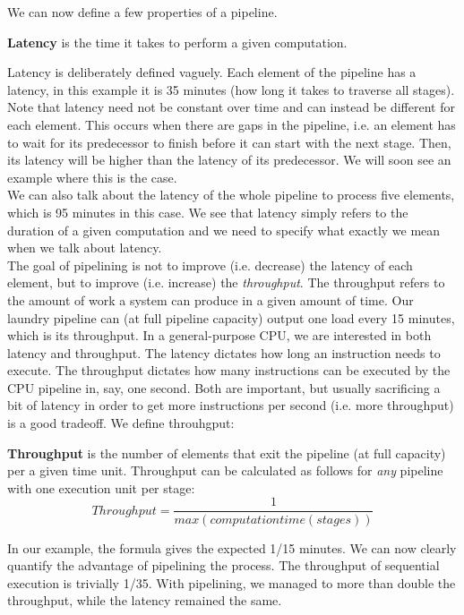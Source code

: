 \documentclass[main.tex]{subfiles}
\begin{document}
We can now define a few properties of a pipeline.
\begin{definition}
    \textbf{Latency} is the time it takes to perform a given computation.
\end{definition}
\noindent Latency is deliberately defined vaguely. Each element of the pipeline has a latency, in this example it is 35 minutes (how long it takes to traverse all stages). Note that latency need not be constant over time and can instead be different for each element. This occurs when there are gaps in the pipeline, i.e. an element has to wait for its predecessor to finish before it can start with the next stage. Then, its latency will be higher than the latency of its predecessor. We will soon see an example where this is the case.\\
We can also talk about the latency of the whole pipeline to process five elements, which is 95 minutes in this case. We see that latency simply refers to the duration of a given computation and we need to specify what exactly we mean when we talk about latency.\\[3mm]
The goal of pipelining is not to improve (i.e. decrease) the latency of each element, but to improve (i.e. increase) the \textit{throughput}. The throughput refers to the amount of work a system can produce in a given amount of time. Our laundry pipeline can (at full pipeline capacity) output one load every 15 minutes, which is its throughput. In a general-purpose CPU, we are interested in both latency and throughput. The latency dictates how long an instruction needs to execute. The throughput dictates how many instructions can be executed by the CPU pipeline in, say, one second. Both are important, but usually sacrificing a bit of latency in order to get more instructions per second (i.e. more throughput) is a good tradeoff. We define throuhgput:
\begin{definition}
    \textbf{Throughput} is the number of elements that exit the pipeline (at full capacity) per a given time unit. Throughput can be calculated as follows for \textit{any} pipeline with one execution unit per stage:
    \begin{equation*}
        Throughput = \frac{1}{max(computationtime(stages))}
    \end{equation*}
\end{definition}
In our example, the formula gives the expected 1/15 minutes. We can now clearly quantify the advantage of pipelining the process. The throughput of sequential execution is trivially 1/35. With pipelining, we managed to more than double the throughput, while the latency remained the same.\\[3mm]
\end{document}
